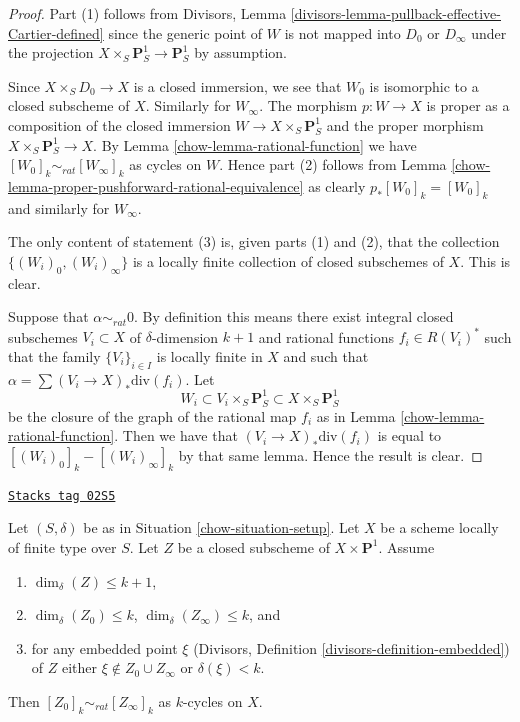 \begin{proof}

Part (1) follows from
Divisors, Lemma \ref{divisors-lemma-pullback-effective-Cartier-defined}
since the generic point
of $W$ is not mapped into $D_0$ or $D_\infty$ under the projection
$X \times_S \mathbf{P}^1_S \to \mathbf{P}^1_S$ by assumption.

\medskip\noindent
Since $X \times_S D_0 \to X$ is a closed immersion, we see that $W_0$
is isomorphic to a closed subscheme of $X$. Similarly for $W_\infty$.
The morphism $p : W \to X$ is proper as a composition of
the closed immersion $W \to X \times_S \mathbf{P}^1_S$ and the
proper morphism $X \times_S \mathbf{P}^1_S \to X$. By
Lemma \ref{chow-lemma-rational-function} we have
$[W_0]_k \sim_{rat} [W_\infty]_k$ as cycles on $W$. Hence part (2) follows from
Lemma \ref{chow-lemma-proper-pushforward-rational-equivalence} as clearly
$p_*[W_0]_k = [W_0]_k$ and similarly for $W_\infty$.

\medskip\noindent
The only content of statement (3) is, given parts (1) and (2), that
the collection $\{(W_i)_0, (W_i)_\infty\}$ is a locally finite collection
of closed subschemes of $X$. This is clear.

\medskip\noindent
Suppose that $\alpha \sim_{rat} 0$.
By definition this means there exist integral closed subschemes
$V_i \subset X$ of $\delta$-dimension $k + 1$ and rational
functions $f_i \in R(V_i)^*$ such that the family
$\{V_i\}_{i \in I}$ is locally finite in $X$ and such that
$\alpha = \sum (V_i \to X)_*\text{div}(f_i)$.
Let
$$
W_i \subset V_i \times_S \mathbf{P}^1_S \subset X \times_S \mathbf{P}^1_S
$$
be the closure of the graph of the rational map $f_i$ as in
Lemma \ref{chow-lemma-rational-function}.
Then we have that $(V_i \to X)_*\text{div}(f_i)$
is equal to $[(W_i)_0]_k - [(W_i)_\infty]_k$ by that same lemma.
Hence the result is clear.
\end{proof}

\begin{lemma}
\label{chow-lemma-closed-subscheme-cross-p1}
\href{https://stacks.math.columbia.edu/tag/02S5}{\texttt{Stacks tag 02S5}}

Let $(S, \delta)$ be as in Situation \ref{chow-situation-setup}.
Let $X$ be a scheme locally of finite type over $S$.
Let $Z$ be a closed subscheme of $X \times \mathbf{P}^1$.
Assume
\begin{enumerate}
\item $\dim_\delta(Z) \leq k + 1$,
\item $\dim_\delta(Z_0) \leq k$, $\dim_\delta(Z_\infty) \leq k$, and
\item for any embedded point $\xi$ (Divisors, Definition
\ref{divisors-definition-embedded}) of $Z$ either
$\xi \not \in Z_0 \cup Z_\infty$ or $\delta(\xi) < k$.
\end{enumerate}
Then $[Z_0]_k \sim_{rat} [Z_\infty]_k$ as $k$-cycles on $X$.
\end{lemma}

